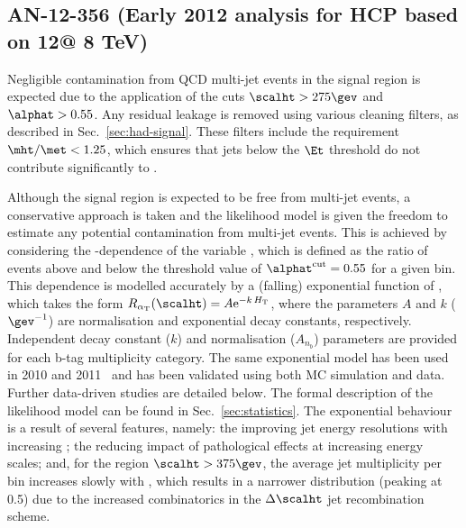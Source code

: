 
\clearpage
\subsection{AN-12-356 (Early 2012 analysis for HCP based on 12\fbinv @ 8 TeV)}

Negligible contamination from QCD multi-jet events in the signal
region is expected due to the application of the cuts $\scalht >
275\gev$ and $\alphat > 0.55$. Any residual leakage is removed using
various cleaning filters, as described in
Sec.~\ref{sec:had-signal}. These filters include the requirement
$\mht/\met < 1.25$, which ensures that jets below the $\Et$ threshold
do not contribute significantly to \mht.

Although the signal region is expected to be free from multi-jet
events, a conservative approach is taken and the likelihood model is
given the freedom to estimate any potential contamination from
multi-jet events. This is achieved by considering the
\scalht-dependence of the variable \RaT, which is defined as the ratio
of events above and below the threshold value of $\alphat^{\rm
  cut}=0.55$ for a given \scalht bin. This dependence is modelled
accurately by a (falling) exponential function of \scalht, which takes
the form $\RaT(\scalht) = A\mathrm{e}^{-k \, H_\text{T}}$, where the
parameters $A$ and $k$ ($\gev^{-1}$) are normalisation and exponential
decay constants, respectively. Independent decay constant ($k$) and
normalisation ($A_{n_b}$) parameters are provided for each b-tag
multiplicity category. The same exponential model has been used in
2010 and 2011~\cite{RA1Paper2011,RA1Paper,RA1PAS2011,RA1PAS2012} and
has been validated using both MC simulation and data. Further
data-driven studies are detailed below. The formal description of the
likelihood model can be found in Sec.~\ref{sec:statistics}. The
exponential behaviour is a result of several features, namely: the
improving jet energy resolutions with increasing \scalht; the reducing
impact of pathological effects at increasing energy scales; and, for
the region $\scalht > 375\gev$, the average jet multiplicity per bin
increases slowly with \scalht, which results in a narrower \alphat
distribution (peaking at 0.5) due to the increased combinatorics in
the $\Delta\scalht$ jet recombination scheme.


